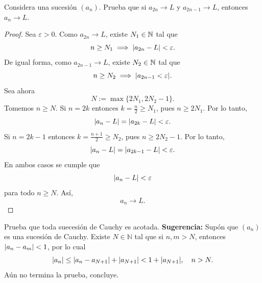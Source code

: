 \documentclass[12pt,a4paper]{article}
\begin{document}
    \begin{mdframed}[style=mdbluebox,frametitle={Ejercicio 4}]
        Considera una sucesión $(a_{n})$. Prueba que si $a_{2n}\to L$ y $a_{2n-1}\to L$, entonces
        $a_{n}\to L$.
    \end{mdframed}

    \begin{proof}
        Sea $\varepsilon\gt0$. Como $a_{2n}\to L$, existe $N_{1}\in\mathbb{N}$ tal que
        \begin{equation*}
            n\geq N_{1}\implies\abs{a_{2n}-L}<\varepsilon.
        \end{equation*}
        De igual forma, como $a_{2n-1}\to L$, existe $N_{2}\in\mathbb{N}$ tal que
        \begin{equation*}
            n\geq N_{2}\implies\abs{a_{2n-1}<\varepsilon}.
        \end{equation*}
        Sea ahora
        \begin{equation*}
            N:=\max\{2N_{1},2N_{2}-1\}.
        \end{equation*}
        Tomemos $n\geq N$. Si $n=2k$ entonces $k=\frac{n}{2}\geq N_{1}$, pues $n\geq2N_{1}$. Por lo tanto,
        \begin{equation*}
            \abs{a_{n}-L}=\abs{a_{2k}-L}<\varepsilon.
        \end{equation*}
        Si $n=2k-1$ entonces $k=\frac{n+1}{2}\geq N_{2}$, pues $n\geq2N_{2}-1$. Por lo tanto,
        \begin{equation*}
            \abs{a_{n}-L}=\abs{a_{2k-1}-L}<\varepsilon.
        \end{equation*}
        En ambos casos se cumple que
        \begin{equation*}
            \abs{a_{n}-L}<\varepsilon
        \end{equation*}
        para todo $n\geq N$. Así,
        \begin{equation*}
            a_{n}\to L.
        \end{equation*}
    \end{proof}

    \begin{mdframed}[style=mdbluebox,frametitle={Ejercicio 5}]
        Prueba que toda suecesión de Cauchy es acotada. \textbf{Sugerencia:} Supón que $(a_{n})$
        es una sucesión de Cauchy. Existe $N\in\mathbb{N}$ tal que si $n,m\gt N$, entonces
        $\abs{a_{n}-a_{m}}<1$, por lo cual
        \begin{equation*}
            \abs{a_{n}}\leq\abs{a_{n}-a_{N+1}}+\abs{a_{N+1}}<1+\abs{a_{N+1}},\quad n> N.
        \end{equation*}
        Aún no termina la prueba, concluye.
    \end{mdframed}
\end{document}
